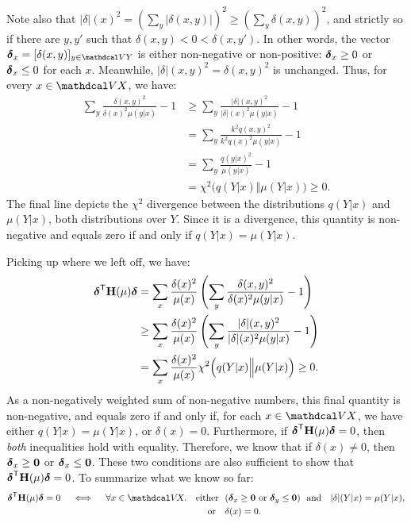 \begin{subappendices}
\begin{lproof}
    Note also that $|\delta|(x)^2 = (\sum_{y} |\delta(x,y)|)^2 \ge (\sum_{y} \delta(x,y))^2$, and strictly so if there are $y,y'$ such that $\delta(x,y) < 0 < \delta(x,y')$.
    In other words, the vector $\bdelta_x = [\delta(x,y)]_{y \in \V Y}$ is either non-negative or non-positive: ${\boldsymbol\delta}_x \ge 0$ or ${\boldsymbol\delta}_x \le 0$ for each $x$.
     Meanwhile, $|\delta|(x,y)^2 = \delta(x,y)^2$ is unchanged.
    Thus, for every $x \in \V X$, we have:
    \begin{align*}
        \sum_y \frac{\delta(x,y)^2}{\delta(x)^2 \mu(y|x)} - 1
        &\ge \sum_y \frac{|\delta|(x,y)^2}{|\delta|(x)^2 \mu(y|x)} - 1 \\
        &= \sum_y \frac{k^2 q(x,y)^2}{k^2 q(x)^2 \mu(y|x)} - 1 \\
        &= \sum_y \frac{ q(y|x)^2}{\mu(y|x)} - 1   \\
        &= \chi^2 \Big( q(Y|x) \Big\Vert  \mu(Y|x) \Big) \ge 0.
    \end{align*}
    The final line depicts the $\chi^2$ divergence between the distributions $q(Y|x)$ and $\mu(Y|x)$, both distributions over $Y$.  Since it is a divergence, this quantity is non-negative and equals zero if and only if $q(Y|x)=\mu(Y|x)$.

    Picking up where we left off, we have:
    \begin{align*}
        {\boldsymbol\delta}^{\sf T} \mathbf H(\mu) {\boldsymbol\delta}
            &= \sum_{x} \frac{\delta(x)^2}{\mu(x)} \left( \sum_y \frac{\delta(x,y)^2}{\delta(x)^2 \mu(y|x)} - 1 \right) \\
            &\ge \sum_{x} \frac{\delta(x)^2}{\mu(x)} \left( \sum_y \frac{|\delta|(x,y)^2}{|\delta|(x)^2 \mu(y|x)} - 1 \right) \\
            &=
            \sum_{x} \frac{\delta(x)^2}{\mu(x)}
            \chi^2 \Big( q(Y|x) \Big\Vert  \mu(Y|x) \Big) \ge 0.
    \end{align*}
    As a non-negatively weighted sum of non-negative numbers, this final quantity is non-negative, and equals zero if and only if, for each $x \in \V X$, we have either $q(Y|x) = \mu(Y|x)$, or $\delta(x) = 0$.
    Furthermore, if ${\boldsymbol\delta}^{\sf T} \mathbf H(\mu) {\boldsymbol\delta} = 0$, then \emph{both} inequalities hold with equality. Therefore, we know that if $\delta(x) \ne 0$, then ${\boldsymbol\delta}_x \ge \mathbf 0$ or ${\boldsymbol\delta}_x \le \mathbf 0$.
    These two conditions are also sufficient to show that ${\boldsymbol\delta}^{\sf T} \mathbf H(\mu) {\boldsymbol\delta} = 0$.
    To summarize what we know so far:
    \begin{align*}
        \bdelta^{\sf T} \mat H(\mu) \bdelta = 0
            \quad\iff\quad\forall x \in \V\!X.\quad
                \text{either}&~~  (\bdelta_x \ge \mat 0 \text{ or } \bdelta_y \le \mat 0) \text{~~and~~ $|\delta|(Y|x) = \mu(Y|x),$}\\
                \text{or }&~~ \delta(x) = 0.
    \end{align*}


\end{lproof}
\end{subappendices}
